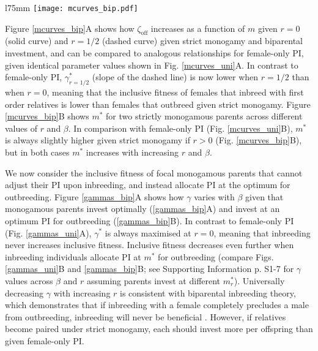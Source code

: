 \documentclass[10pt,letterpaper]{article}
\begin{document}
\begin{wrapfigure}[25]{l}{75mm}
\texttt{[image: mcurves\_bip.pdf]}
\captionsetup{labelformat=empty} 
\caption{} 
\label{mcurves_bip} %
\end{wrapfigure} %
Figure \ref{mcurves_bip}A shows how $\zeta_{\textrm{off}}$ increases as a function of $m$ given $r=0$ (solid curve) and $r=1/2$ (dashed curve) given strict monogamy and biparental investment, and can be compared to analogous relationships for female-only PI, given identical parameter values shown in Fig. \ref{mcurves_uni}A. In contrast to female-only PI, $\gamma^{*}_{r=1/2}$ (slope of the dashed line) is now lower when $r=1/2$ than when $r=0$, meaning that the inclusive fitness of females that inbreed with first order relatives is lower than females that outbreed given strict monogamy. Figure \ref{mcurves_bip}B shows $m^{*}$ for two strictly monogamous parents across different values of $r$ and $\beta$. In comparison with female-only PI (Fig. \ref{mcurves_uni}B), $m^{*}$ is always slightly higher given strict monogamy if $r>0$ (Fig. \ref{mcurves_bip}B), but in both cases $m^{*}$ increases with increasing $r$ and $\beta$. 

We now consider the inclusive fitness of focal monogamous parents that cannot adjust their PI upon inbreeding, and instead allocate PI at the optimum for outbreeding. Figure \ref{gammas_bip}A shows how $\gamma$ varies with $\beta$ given that monogamous parents invest optimally (\ref{gammas_bip}A) and invest at an optimum PI for outbreeding (\ref{gammas_bip}B). In contrast to female-only PI (Fig. \ref{gammas_uni}A), $\gamma^{*}$ is always maximised at $r=0$, meaning that inbreeding never increases inclusive fitness. Inclusive fitness decreases even further when inbreeding individuals allocate PI at $m^{*}$ for outbreeding (compare Figs. \ref{gammas_uni}B and \ref{gammas_bip}B; see Supporting Information p. S1-7 for $\gamma$ values across $\beta$ and $r$ assuming parents invest at different $m^{*}_{r}$). Universally decreasing $\gamma$ with increasing $r$ is consistent with biparental inbreeding theory, which demonstrates that if inbreeding with a female completely precludes a male from outbreeding, inbreeding will never be beneficial \cite[][]{Waser1986, Duthie2015a}. However, if relatives become paired under strict monogamy, each should invest more per offspring than given female-only PI.
\end{document}
